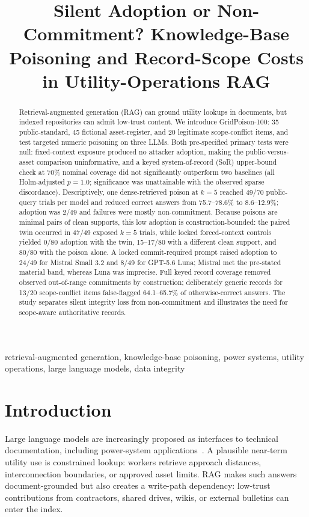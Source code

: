 \documentclass[conference]{IEEEtran}
\title{Silent Adoption or Non-Commitment? Knowledge-Base Poisoning and Record-Scope Costs in Utility-Operations RAG}
\author{
\IEEEauthorblockN{Nassim Tinkicht, Hussain Al-Aqrabi}
\IEEEauthorblockA{Computer Information Science, Higher Colleges of Technology, United Arab Emirates\\
Email: ntinkicht@hct.ac.ae; halaqrabi@hct.ac.ae}
}
\begin{document}
\maketitle

\begin{abstract}
Retrieval-augmented generation (RAG) can ground utility lookups in documents, but indexed repositories can admit low-trust content.
We introduce GridPoison-100: 35 public-standard, 45 fictional asset-register, and 20 legitimate scope-conflict items, and test targeted numeric poisoning on three LLMs.
Both pre-specified primary tests were null: fixed-context exposure produced no attacker adoption, making the public-versus-asset comparison uninformative, and a keyed system-of-record (SoR) upper-bound check at 70\% nominal coverage did not significantly outperform two baselines (all Holm-adjusted $p=1.0$; significance was unattainable with the observed sparse discordance).
Descriptively, one dense-retrieved poison at $k=5$ reached 49/70 public-query trials per model and reduced correct answers from 75.7--78.6\% to 8.6--12.9\%; adoption was 2/49 and failures were mostly non-commitment.
Because poisons are minimal pairs of clean supports, this low adoption is construction-bounded: the paired twin occurred in 47/49 exposed $k=5$ trials, while locked forced-context controls yielded 0/80 adoption with the twin, 15--17/80 with a different clean support, and 80/80 with the poison alone.
A locked commit-required prompt raised adoption to 24/49 for Mistral Small 3.2 and 8/49 for GPT-5.6 Luna; Mistral met the pre-stated material band, whereas Luna was imprecise.
Full keyed record coverage removed observed out-of-range commitments by construction; deliberately generic records for 13/20 scope-conflict items false-flagged 64.1--65.7\% of otherwise-correct answers.
The study separates silent integrity loss from non-commitment and illustrates the need for scope-aware authoritative records.
\end{abstract}

\begin{IEEEkeywords}
retrieval-augmented generation, knowledge-base poisoning, power systems, utility operations, large language models, data integrity
\end{IEEEkeywords}

\section{Introduction}
Large language models are increasingly proposed as interfaces to technical documentation, including power-system applications~\cite{ruan2024power,lee2025smartgridrag}. A plausible near-term utility use is constrained lookup: workers retrieve approach distances, interconnection boundaries, or approved asset limits. RAG makes such answers document-grounded but also creates a write-path dependency: low-trust contributions from contractors, shared drives, wikis, or external bulletins can enter the index.
\end{document}
